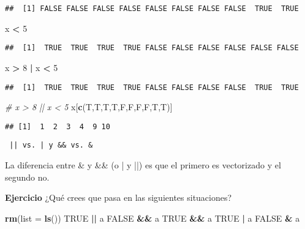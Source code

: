 \documentclass[]{article}
\newenvironment{Shaded}{\begin{snugshade}}{\end{snugshade}}
\newcommand{\KeywordTok}[1]{\textcolor[rgb]{0.13,0.29,0.53}{\textbf{#1}}}
\newcommand{\DataTypeTok}[1]{\textcolor[rgb]{0.13,0.29,0.53}{#1}}
\newcommand{\DecValTok}[1]{\textcolor[rgb]{0.00,0.00,0.81}{#1}}
\newcommand{\StringTok}[1]{\textcolor[rgb]{0.31,0.60,0.02}{#1}}
\newcommand{\CommentTok}[1]{\textcolor[rgb]{0.56,0.35,0.01}{\textit{#1}}}
\newcommand{\OtherTok}[1]{\textcolor[rgb]{0.56,0.35,0.01}{#1}}
\newcommand{\OperatorTok}[1]{\textcolor[rgb]{0.81,0.36,0.00}{\textbf{#1}}}
\newcommand{\NormalTok}[1]{#1}
\begin{document}
\begin{verbatim}
##  [1] FALSE FALSE FALSE FALSE FALSE FALSE FALSE FALSE  TRUE  TRUE
\end{verbatim}

\begin{Shaded}
\begin{Highlighting}[]
\NormalTok{x }\OperatorTok{<}\StringTok{ }\DecValTok{5}
\end{Highlighting}
\end{Shaded}

\begin{verbatim}
##  [1]  TRUE  TRUE  TRUE  TRUE FALSE FALSE FALSE FALSE FALSE FALSE
\end{verbatim}

\begin{Shaded}
\begin{Highlighting}[]
\NormalTok{x }\OperatorTok{>}\StringTok{ }\DecValTok{8} \OperatorTok{|}\StringTok{ }\NormalTok{x }\OperatorTok{<}\StringTok{ }\DecValTok{5}
\end{Highlighting}
\end{Shaded}

\begin{verbatim}
##  [1]  TRUE  TRUE  TRUE  TRUE FALSE FALSE FALSE FALSE  TRUE  TRUE
\end{verbatim}

\begin{Shaded}
\begin{Highlighting}[]
\CommentTok{# x > 8 || x < 5}
\NormalTok{x[}\KeywordTok{c}\NormalTok{(T,T,T,T,F,F,F,F,T,T)]}
\end{Highlighting}
\end{Shaded}

\begin{verbatim}
## [1]  1  2  3  4  9 10
\end{verbatim}

\begin{nota}
\begin{verbatim} || vs. | y && vs. & \end{verbatim}
La diferencia entre \& y \&\& (o | y ||) es que el primero es vectorizado y el
segundo no.
\end{nota}

\textbf{Ejercicio} ¿Qué crees que pasa en las siguientes situaciones?

\begin{Shaded}
\begin{Highlighting}[]
\KeywordTok{rm}\NormalTok{(}\DataTypeTok{list =} \KeywordTok{ls}\NormalTok{())}
\OtherTok{TRUE} \OperatorTok{||}\StringTok{ }\NormalTok{a}
\OtherTok{FALSE} \OperatorTok{&&}\StringTok{ }\NormalTok{a}
\OtherTok{TRUE} \OperatorTok{&&}\StringTok{ }\NormalTok{a}
\OtherTok{TRUE} \OperatorTok{|}\StringTok{ }\NormalTok{a}
\OtherTok{FALSE} \OperatorTok{&}\StringTok{ }\NormalTok{a}
\end{Highlighting}
\end{Shaded}
\end{document}
